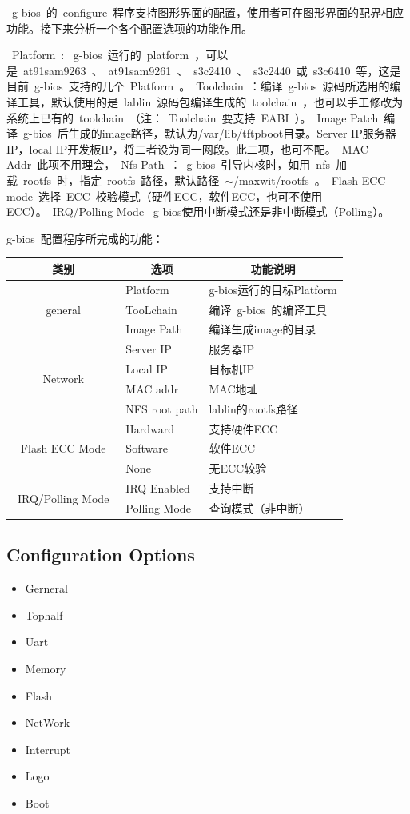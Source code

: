 \documentclass[a4paper,11pt]{book}
\begin{document}
~g-bios~的~configure~程序支持图形界面的配置，使用者可在图形界面的配界相应功能。接下来分析一个各个配置选项的功能作用。

~Platform~:	~g-bios~运行的~platform~，可以是~at91sam9263~、~at91sam9261~、~s3c2410~、~s3c2440~或~s3c6410~等，这是目前~g-bios~支持的几个~Platform~。~Toolchain~：编译~g-bios~源码所选用的编译工具，默认使用的是~lablin~源码包编译生成的~toolchain~，也可以手工修改为系统上已有的~toolchain~（注：~Toolchain~要支持~EABI~）。~Image Patch~编译~g-bios~后生成的image路径，默认为/var/lib/tftpboot目录。Server IP服务器IP，local IP开发板IP，将二者设为同一网段。此二项，也可不配。~MAC Addr~此项不用理会，~Nfs Path~：~g-bios~引导内核时，如用~nfs~加载~rootfs~时，指定~rootfs~路径，默认路径~$\sim$/maxwit/rootfs~。~Flash ECC mode~选择~ECC~校验模式（硬件ECC，软件ECC，也可不使用ECC）。~IRQ/Polling Mode~ g-bios使用中断模式还是非中断模式（Polling）。

g-bios~配置程序所完成的功能：
\begin{table}[htbp]
\centering
\setlength{\parindent}{0pt}
\begin{tabular}{|c|l|l|}
\hline
类别 & \multicolumn{1}{|c|}{选项} & \multicolumn{1}{|c|}{功能说明} \\ \hline
\multirow{3}{*}{general} & Platform & g-bios运行的目标Platform \\ \cline{2-3}
		& TooLchain & 编译~g-bios~的编译工具 \\ \cline{2-3}
		& Image Path & 编译生成image的目录 \\ \hline
\multirow{4}{*}{Network} & Server IP & 服务器IP \\ \cline{2-3}
		& Local IP & 目标机IP \\ \cline{2-3}
		& MAC addr & MAC地址\\ \cline{2-3}
		& NFS root path &  lablin的rootfs路径\\ \hline
\multirow{3}{*}{~Flash ECC Mode~}   & Hardward & 支持硬件ECC\\ \cline{2-3}
		& Software & 软件ECC\\ \cline{2-3}
		& None & 无ECC较验\\ \cline{2-3}
\multirow{2}{*}{~IRQ/Polling Mode~} & IRQ Enabled & 支持中断 \\ \cline{2-3}
		& Polling Mode & 查询模式（非中断）\\ \hline
\end{tabular}
\end{table}

\subsection{Configuration Options}
\begin{itemize}
\item Gerneral
\item Tophalf
\item Uart
\item Memory
\item Flash
\item NetWork
\item Interrupt
\item Logo
\item Boot
\end{itemize}
\end{document}
